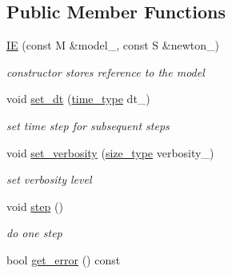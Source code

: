\subsection*{Public Member Functions}
\begin{DoxyCompactItemize}
\item 
\hypertarget{classhdnum_1_1IE_a25d8827c46865a4b6dae56a07b70f507}{
\hyperlink{classhdnum_1_1IE_a25d8827c46865a4b6dae56a07b70f507}{IE} (const M \&model\_\-, const S \&newton\_\-)}
\label{classhdnum_1_1IE_a25d8827c46865a4b6dae56a07b70f507}

\begin{DoxyCompactList}\small\item\em constructor stores reference to the model \item\end{DoxyCompactList}\item 
\hypertarget{classhdnum_1_1IE_a26bfa23447038750257ecdf75d341283}{
void \hyperlink{classhdnum_1_1IE_a26bfa23447038750257ecdf75d341283}{set\_\-dt} (\hyperlink{classhdnum_1_1IE_a4a58f86ec61809cbca7b16922dcbb39e}{time\_\-type} dt\_\-)}
\label{classhdnum_1_1IE_a26bfa23447038750257ecdf75d341283}

\begin{DoxyCompactList}\small\item\em set time step for subsequent steps \item\end{DoxyCompactList}\item 
\hypertarget{classhdnum_1_1IE_a3ece1463453f15fe247c030e487ea232}{
void \hyperlink{classhdnum_1_1IE_a3ece1463453f15fe247c030e487ea232}{set\_\-verbosity} (\hyperlink{classhdnum_1_1IE_af2d3dd8c57bb78dfd28a613dd11f499a}{size\_\-type} verbosity\_\-)}
\label{classhdnum_1_1IE_a3ece1463453f15fe247c030e487ea232}

\begin{DoxyCompactList}\small\item\em set verbosity level \item\end{DoxyCompactList}\item 
\hypertarget{classhdnum_1_1IE_a947a239a2ddfe6d3f946db28f04a900d}{
void \hyperlink{classhdnum_1_1IE_a947a239a2ddfe6d3f946db28f04a900d}{step} ()}
\label{classhdnum_1_1IE_a947a239a2ddfe6d3f946db28f04a900d}

\begin{DoxyCompactList}\small\item\em do one step \item\end{DoxyCompactList}\item 
\hypertarget{classhdnum_1_1IE_a69b53dd12e5b00739b26551102c090bb}{
bool \hyperlink{classhdnum_1_1IE_a69b53dd12e5b00739b26551102c090bb}{get\_\-error} () const }
\label{classhdnum_1_1IE_a69b53dd12e5b00739b26551102c090bb}


\end{DoxyCompactItemize}
